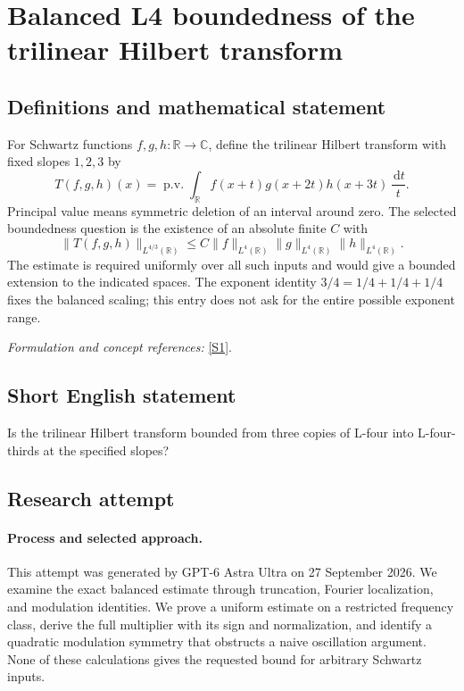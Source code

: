 \documentclass[11pt]{article}
\begin{document}
\section*{\texorpdfstring{Balanced L4 boundedness of the trilinear Hilbert transform}{Balanced L4 boundedness of the trilinear Hilbert transform}}\label{statement}
\subsection{Definitions and mathematical statement}
For Schwartz functions $f,g,h:{\mathbb{R}}\to{\mathbb{C}}$, define the trilinear Hilbert transform with fixed slopes $1,2,3$ by
\[
 T(f,g,h)(x)=\operatorname{p.v.}\int_{{\mathbb{R}}}
 f(x+t)g(x+2t)h(x+3t)\,\frac{{\,\mathrm{d}} t}{t}.
\]
Principal value means symmetric deletion of an interval around zero. The selected boundedness question is the existence of an absolute finite $C$ with
\[
 \|T(f,g,h)\|_{L^{4/3}({\mathbb{R}})}
 \le C\|f\|_{L^4({\mathbb{R}})}\|g\|_{L^4({\mathbb{R}})}\|h\|_{L^4({\mathbb{R}})}.
\]
The estimate is required uniformly over all such inputs and would give a bounded extension to the indicated spaces. The exponent identity $3/4=1/4+1/4+1/4$ fixes the balanced scaling; this entry does not ask for the entire possible exponent range.
\par\smallskip\textit{Formulation and concept references:} \href{https://terrytao.wordpress.com/2007/05/10/open-question-boundedness-of-the-trilinear-hilbert-transform/}{[S1]}.

\subsection{Short English statement}
Is the trilinear Hilbert transform bounded from three copies of L-four into L-four-thirds at the specified slopes?
\subsection{Research attempt}
\paragraph{Process and selected approach.}
This attempt was generated by GPT-6 Astra Ultra on 27 September 2026. We examine the exact balanced estimate through truncation, Fourier localization, and modulation identities. We prove a uniform estimate on a restricted frequency class, derive the full multiplier with its sign and normalization, and identify a quadratic modulation symmetry that obstructs a naive oscillation argument. None of these calculations gives the requested bound for arbitrary Schwartz inputs.
\end{document}
